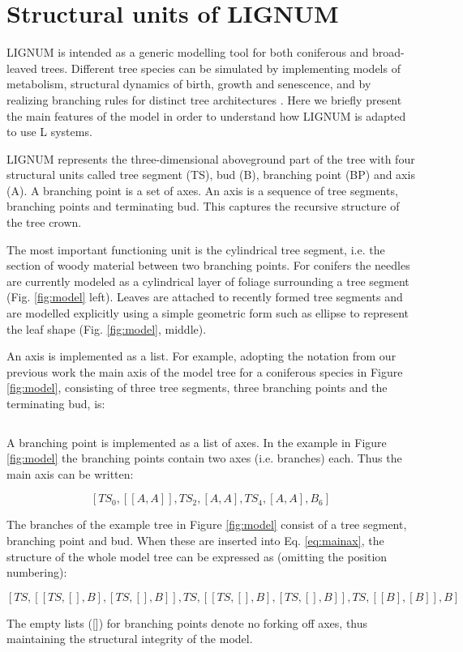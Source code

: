 \section{Structural units  of LIGNUM} LIGNUM is intended  as a generic
modelling tool for both  coniferous and broad-leaved trees.  Different
tree species  can be simulated  by implementing models  of metabolism,
structural dynamics of birth,  growth and senescence, and by realizing
branching rules  for distinct tree  architectures \citep{perttunen:96,
perttunen:01}.  Here we briefly present the main features of the model
in order to understand how LIGNUM is adapted to use L systems.

LIGNUM represents  the three-dimensional aboveground part  of the tree
with  four  structural  units  called  tree  segment  (TS),  bud  (B),
branching point  (BP) and  axis (A).   A branching point  is a  set of
axes. An  axis is  a sequence of  tree segments, branching  points and
terminating bud.   This captures the  recursive structure of  the tree
crown.

The most  important functioning unit is the  cylindrical tree segment,
i.e. the section of woody  material between two branching points.  For
conifers the needles  are currently modeled as a  cylindrical layer of
foliage  surrounding  a  tree  segment (Fig.   \ref{fig:model}  left).
Leaves are attached to recently  formed tree segments and are modelled
explicitly using a simple geometric  form such as ellipse to represent
the leaf shape (Fig. \ref{fig:model}, middle).

An axis is  implemented as a list. For  example, adopting the notation
from our previous work \citep{perttunen:96} the main axis of the model
tree for a coniferous species in Figure \ref{fig:model}, consisting of
three tree  segments, three branching points and  the terminating bud,
is:

\begin{equation}
[TS_0,BP_1,TS_2,BP_3,TS_4,BP_5,B_6]
\end{equation}

A branching point is implemented as  a list of axes. In the example in
Figure   \ref{fig:model}  the  branching   points  contain   two  axes
(i.e. branches) each. Thus the main axis can be written:

\begin{equation}\label{eq:mainax}
[TS_0,[[A,A]],TS_2,[A,A],TS_4,[A,A],B_6]
\end{equation}

The branches of the example  tree in Figure \ref{fig:model} consist of
a tree segment, branching point  and bud. When these are inserted into
Eq.  \ref{eq:mainax}, the  structure of  the whole  model tree  can be
expressed as (omitting the position numbering):

\begin{equation}\label{eq:tree}
[TS,[[TS,[],B],[TS,[],B]],TS,[[TS,[],B],[TS,[],B]],TS,[[B],[B]],B]
\end{equation}

The empty lists ([]) for  branching points denote no forking off axes,
thus maintaining the structural integrity of the model.

